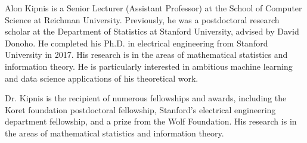 Alon Kipnis is a Senior Lecturer (Assistant Professor) at the School of Computer Science at Reichman University. Previously, he was a postdoctoral research scholar at the Department of Statistics at Stanford University, advised by David Donoho. He completed his Ph.D. in electrical engineering from Stanford University in 2017. His research is in the areas of mathematical statistics and information theory. He is particularly interested in ambitious machine learning and data science applications of his theoretical work.

Dr. Kipnis is the recipient of numerous fellowships and awards, including the Koret foundation postdoctoral fellowship, Stanford's electrical engineering department fellowship, and a prize from the Wolf Foundation. His research is in the areas of mathematical statistics and information theory.